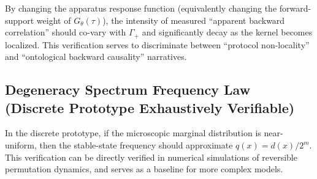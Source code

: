 By changing the apparatus response function (equivalently changing the forward-support weight of $G_{\theta}(\tau)$), the intensity of measured ``apparent backward correlation'' should co-vary with $\Gamma_+$ and significantly decay as the kernel becomes localized. This verification serves to discriminate between ``protocol non-locality'' and ``ontological backward causality'' narratives.

\subsection{Degeneracy Spectrum Frequency Law (Discrete Prototype Exhaustively Verifiable)}

In the discrete prototype, if the microscopic marginal distribution is near-uniform, then the stable-state frequency should approximate $q(x)=d(x)/2^m$. This verification can be directly verified in numerical simulations of reversible permutation dynamics, and serves as a baseline for more complex models.
